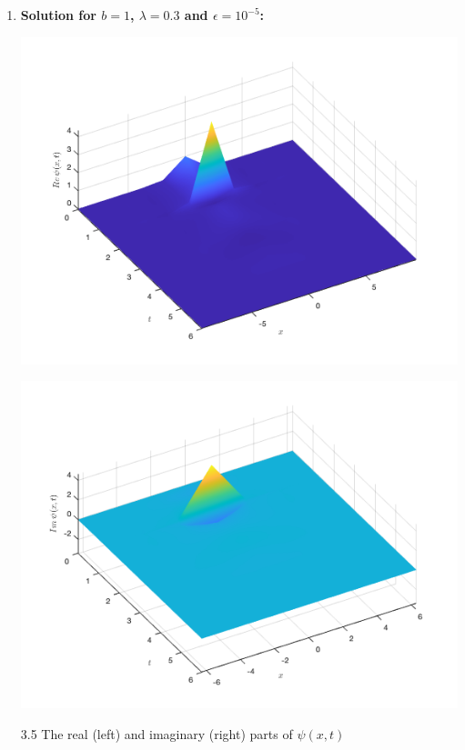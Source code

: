 \documentclass[12pt, letterpaper, twoside]{article}
\begin{document}
\begin{enumerate}[label=(\roman*)]
    \item \textbf{Solution for $b=1$, $\lambda=0.3$ and $\epsilon=10^{-5}$:}
   \begin{multicols}{2}
        \begin{center}
            \includegraphics[scale=0.35]{with friction/b1real.png}
        \end{center} 
        \begin{center}
            \includegraphics[scale=0.35]{with friction/b1imag.png}
        \end{center}  
    \end{multicols}
    \figurename{ 3.5 The real (left) and imaginary (right) parts of $\psi(x, t)$}
    

\end{enumerate}
\end{document}
